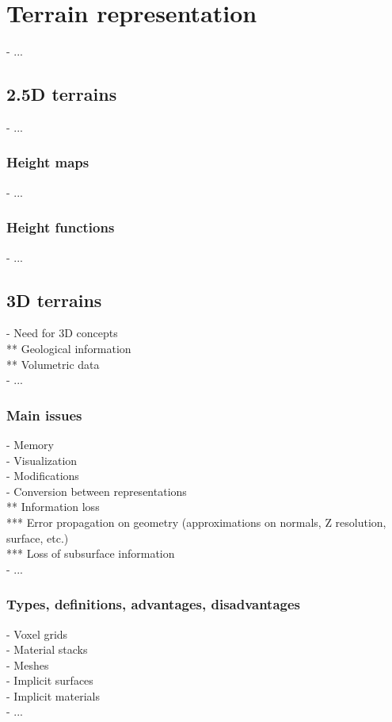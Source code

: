 \section{Terrain representation}
\label{sec:state-of-the-art_terrain-representations}
- ...

\subsection{2.5D terrains}
- ...

\subsubsection{Height maps}
- ...

\subsubsection{Height functions}
- ...

\subsection{3D terrains}
- Need for 3D concepts \\
** Geological information \\
** Volumetric data \\
- ...

\subsubsection{Main issues}
- Memory \\
- Visualization \\
- Modifications \\
- Conversion between representations \\
** Information loss \\
*** Error propagation on geometry (approximations on normals, Z resolution, surface, etc.) \\
*** Loss of subsurface information \\
- ...

\subsubsection{Types, definitions, advantages, disadvantages}
- Voxel grids \\
- Material stacks \\
- Meshes \\
- Implicit surfaces \\
- Implicit materials \\
- ...

